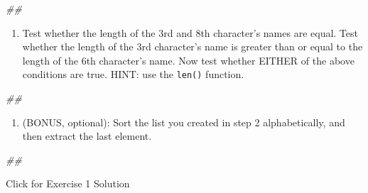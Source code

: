 \documentclass[
]{book}
\newenvironment{Shaded}{\begin{snugshade}}{\end{snugshade}}
\newcommand{\CommentTok}[1]{\textcolor[rgb]{0.56,0.35,0.01}{\textit{#1}}}
\providecommand{\tightlist}{%
  \setlength{\itemsep}{0pt}\setlength{\parskip}{0pt}}
\begin{document}
\begin{Shaded}
\begin{Highlighting}[]
\CommentTok{\#\#}
\end{Highlighting}
\end{Shaded}

\begin{enumerate}
\def\labelenumi{\arabic{enumi}.}
\setcounter{enumi}{2}
\tightlist
\item
  Test whether the length of the 3rd and 8th character's names are equal. Test whether the length of
  the 3rd character's name is greater than or equal to the length of the 6th character's name. Now test
  whether EITHER of the above conditions are true. HINT: use the \texttt{len()} function.
\end{enumerate}

\begin{Shaded}
\begin{Highlighting}[]
\CommentTok{\#\#}
\end{Highlighting}
\end{Shaded}

\begin{enumerate}
\def\labelenumi{\arabic{enumi}.}
\setcounter{enumi}{3}
\tightlist
\item
  (BONUS, optional): Sort the list you created in step 2 alphabetically,
  and then extract the last element.
\end{enumerate}

\begin{Shaded}
\begin{Highlighting}[]
\CommentTok{\#\#}
\end{Highlighting}
\end{Shaded}

{Click for Exercise 1 Solution}
\end{document}
